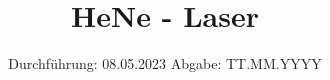 

\subject{V61}
\title{HeNe - Laser}
\date{%
  Durchführung: 08.05.2023
  \hspace{3em}
  Abgabe: TT.MM.YYYY
}



\maketitle
\setcounter{page}{1}







\printbibliography{}


